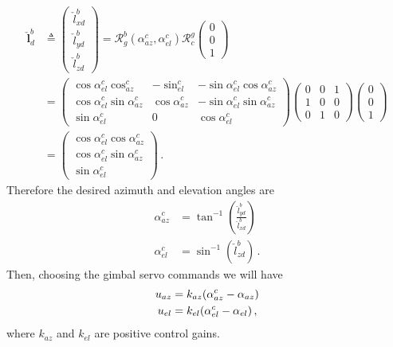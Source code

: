 \begin{align}
\check{\boldsymbol{l}}_d^b&\triangleq
\begin{pmatrix}
\check{l}_{xd}^b \\
\check{l}_{yd}^b \\
\check{l}_{zd}^b
\end{pmatrix}
= \mathcal{R}_g^b(\alpha_{az}^c,\alpha_{el}^c)\mathcal{R}_c^g
\begin{pmatrix}
0 \\
0 \\
1 
\end{pmatrix} \\
&=
\begin{pmatrix}
\cos\alpha_{el}^c\cos_{az}^c & -\sin_{el}^c & -\sin\alpha_{el}^c\cos\alpha_{az}^c \\
\cos\alpha_{el}^c\sin\alpha_{az}^c & \cos\alpha_{az}^c & -\sin\alpha_{el}^c\sin\alpha_{az}^c \\
\sin\alpha_{el}^c & 0 & \cos\alpha_{el}^c
\end{pmatrix}
\begin{pmatrix}
0 & 0 & 1 \\
1 & 0 & 0 \\
0 & 1 & 0 
\end{pmatrix}
\begin{pmatrix}
0 \\
0 \\
1
\end{pmatrix} \\
&= 
\begin{pmatrix}
\cos\alpha_{el}^c\cos\alpha_{az}^c \\
\cos\alpha_{el}^c\sin\alpha_{az}^c \\
\sin\alpha_{el}^c
\end{pmatrix}\,.
\end{align}
Therefore the desired azimuth and elevation angles are
\begin{align}
\alpha_{az}^c&=\tan^{-1}\left(\frac{\check{l}_{yd}^b}{\check{l}_{xd}^b}\right) \\
\alpha_{el}^c&=\sin^{-1}\left(\check{l}_{zd}^b\right)\,.
\end{align}
Then, choosing the gimbal servo commands we will have 
\begin{align}{\label{eq:servo_commands}}
u_{az}&=k_{az}(\alpha_{az}^c-\alpha_{az}) \\
u_{el}&=k_{el}(\alpha_{el}^c-\alpha_{el})\,,
\end{align}
where $k_{az}$ and $k_{el}$ are positive control gains.

